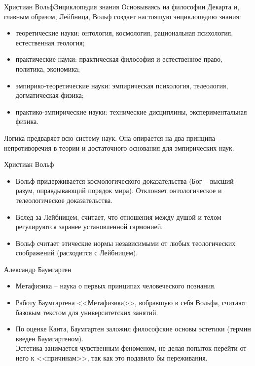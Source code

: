 \documentclass{beamer}
\begin{document}
    \begin{frame}{Христиан Вольф}{Энциклопедия знания}
        Основываясь на философии Декарта и, главным образом, Лейбница,
        Вольф создает настоящую энциклопедию знания:
        \begin{itemize}
        \item теоретические науки: онтология, космология,
            рациональная психология, естественная теология;
        \item практические науки: практическая философия и естественное право,
            политика, экономика;
        \item эмпирико-теоретические науки: эмпирическая психология,
            телеология, догматическая физика;
        \item практико-эмпирические науки: технические дисциплины,
            экспериментальная физика.
        \end{itemize}
        Логика предваряет всю систему наук.
        Она опирается на два принципа -- непротиворечия в теории и
        достаточного основания для эмпирических наук.
    \end{frame}

    \begin{frame}{Христиан Вольф}
        \begin{itemize}
        \item Вольф придерживается космологического доказательства
            (Бог -- высший разум, оправдывающий порядок мира).
            Отклоняет онтологическое и телеологическое доказательства.
        \item Вслед за Лейбницем, считает, что отношения между душой и телом
            регулируются заранее установленной гармонией.
        \item Вольф считает этические нормы независимыми от
            любых теологических соображений (расходится с Лейбницем).
        \end{itemize}
    \end{frame}

    \begin{frame}{Александр Баумгартен}
        \begin{itemize}
        \item Метафизика -- наука о первых принципах человеческого познания.
        \item Работу Баумгартена <<Метафизика>>, вобравшую в себя Вольфа,
            считают базовым текстом для университетских занятий.
        \item По оценке Канта, Баумгартен заложил философские основы эстетики
            (термин введен Баумгартеном).\\
            Эстетика занимается чувственным феноменом,
            не делая попыток перейти от него к <<причинам>>,
            так как это подавило бы переживания.
        \end{itemize}
    \end{frame}
\end{document}
